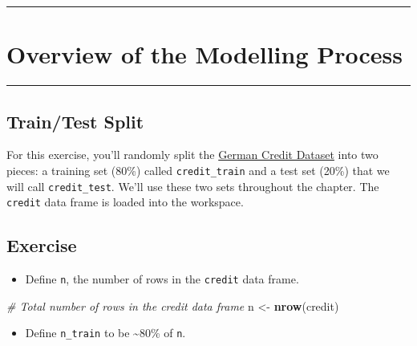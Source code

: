 \documentclass[
]{book}
\newenvironment{Shaded}{\begin{snugshade}}{\end{snugshade}}
\newcommand{\CommentTok}[1]{\textcolor[rgb]{0.56,0.35,0.01}{\textit{#1}}}
\newcommand{\KeywordTok}[1]{\textcolor[rgb]{0.13,0.29,0.53}{\textbf{#1}}}
\newcommand{\NormalTok}[1]{#1}
\newcommand{\StringTok}[1]{\textcolor[rgb]{0.31,0.60,0.02}{#1}}
\providecommand{\tightlist}{%
  \setlength{\itemsep}{0pt}\setlength{\parskip}{0pt}}
\begin{document}
\begin{center}\rule{0.5\linewidth}{0.5pt}\end{center}

\hypertarget{overview-of-the-modelling-process}{%
\section{Overview of the Modelling Process}\label{overview-of-the-modelling-process}}

\begin{center}\rule{0.5\linewidth}{0.5pt}\end{center}

\hypertarget{traintest-split}{%
\subsection{Train/Test Split}\label{traintest-split}}

For this exercise, you'll randomly split the \href{}{German Credit Dataset} into two pieces: a training set (80\%) called \texttt{credit\_train} and a test set (20\%) that we will call \texttt{credit\_test}. We'll use these two sets throughout the chapter. The \texttt{credit} data frame is loaded into the workspace.

\hypertarget{exercise-1}{%
\subsection*{Exercise}\label{exercise-1}}

\begin{itemize}
\tightlist
\item
  Define \texttt{n}, the number of rows in the \texttt{credit} data frame.
\end{itemize}

\begin{Shaded}
\begin{Highlighting}[]
\CommentTok{# Total number of rows in the credit data frame}
\NormalTok{n <-}\StringTok{ }\KeywordTok{nrow}\NormalTok{(credit)}
\end{Highlighting}
\end{Shaded}

\begin{itemize}
\tightlist
\item
  Define \texttt{n\_train} to be \textasciitilde80\% of \texttt{n}.
\end{itemize}
\end{document}
